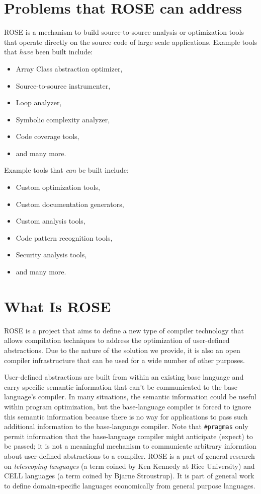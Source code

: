 \section{Problems that ROSE can address}
    ROSE is a mechanism to build source-to-source analysis or 
optimization tools that operate directly on the source code of large 
scale applications.  Example tools that {\em have} been built include:
\begin{itemize}
   \item Array Class abstraction optimizer,
   \item Source-to-source instrumenter,
   \item Loop analyzer,
   \item Symbolic complexity analyzer,
   \item Code coverage tools,
   \item and many more.
\end{itemize}
Example tools that {\em can} be built include:
\begin{itemize}
   \item Custom optimization tools,
   \item Custom documentation generators,
   \item Custom analysis tools,
   \item Code pattern recognition tools,
   \item Security analysis tools,
   \item and many more.
\end{itemize}


\section{What Is ROSE}
ROSE is a project that aims to define a new type of compiler technology that allows
compilation techniques to address the optimization of user-defined abstractions.
Due to the nature of the solution we provide, it is also an open compiler infrastructure
that can be used for a wide number of other purposes.

   User-defined abstractions are built from within an existing base language and
carry specific semantic information that can't be communicated to the base
language's compiler.  In many situations, the semantic information could be useful within
program optimization, but the base-language compiler is forced to ignore this semantic 
information because there is no way for applications to pass such additional information 
to the base-language compiler. Note that {\tt \#pragmas} only permit information that the 
base-language compiler might anticipate (expect) to be passed; it is not a meaningful 
mechanism to communicate arbitrary informtion about user-defined abstractions to a 
compiler.  ROSE is a part of general research on {\em telescoping languages} (a term 
coined by Ken Kennedy at Rice University) and CELL languages (a term coined by 
Bjarne Stroustrup).  It is part of general work to define domain-specific languages
economically from general purpose languages.

